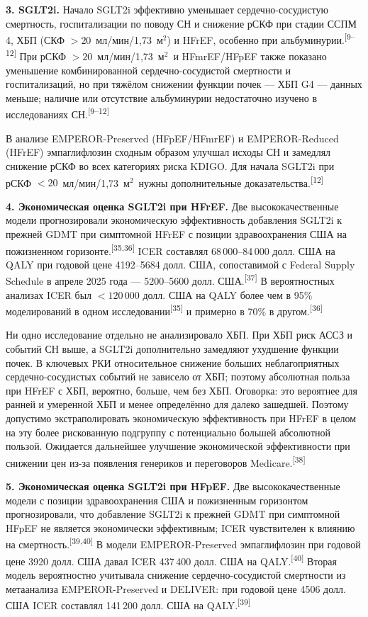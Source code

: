 \documentclass[11pt,a4paper]{article}
\newcommand{\src}[1]{\textsuperscript{[#1]}}
\newcommand{\unitgfr}{мл/мин/1,73~м$^2$}
\begin{document}
\textbf{3. SGLT2i.} Начало SGLT2i эффективно уменьшает сердечно-сосудистую смертность, госпитализации по поводу СН и снижение рСКФ при стадии ССПМ 4, ХБП (СКФ $>20$~\unitgfr) и HFrEF, особенно при альбуминурии.\src{9--12} При рСКФ $>20$~\unitgfr\ и HFmrEF/HFpEF также показано уменьшение комбинированной сердечно-сосудистой смертности и госпитализаций, но при тяжёлом снижении функции почек --- ХБП G4 --- данных меньше; наличие или отсутствие альбуминурии недостаточно изучено в исследованиях СН.\src{9--12}

В анализе EMPEROR-Preserved (HFpEF/HFmrEF) и EMPEROR-Reduced (HFrEF) эмпаглифлозин сходным образом улучшал исходы СН и замедлял снижение рСКФ во всех категориях риска KDIGO. Для начала SGLT2i при рСКФ $<20$~\unitgfr\ нужны дополнительные доказательства.\src{12}

\textbf{4. Экономическая оценка SGLT2i при HFrEF.} Две высококачественные модели прогнозировали экономическую эффективность добавления SGLT2i к прежней GDMT при симптомной HFrEF с позиции здравоохранения США на пожизненном горизонте.\src{35,36} ICER составлял 68\,000--84\,000 долл. США на QALY при годовой цене 4192--5684 долл. США, сопоставимой с Federal Supply Schedule в апреле 2025 года --- 5200--5600 долл. США.\src{37} В вероятностных анализах ICER был $<120\,000$ долл. США на QALY более чем в 95\% моделирований в одном исследовании\src{35} и примерно в 70\% в другом.\src{36}

Ни одно исследование отдельно не анализировало ХБП. При ХБП риск АССЗ и событий СН выше, а SGLT2i дополнительно замедляют ухудшение функции почек. В ключевых РКИ относительное снижение больших неблагоприятных сердечно-сосудистых событий не зависело от ХБП; поэтому абсолютная польза при HFrEF с ХБП, вероятно, больше, чем без ХБП. Оговорка: это вероятнее для ранней и умеренной ХБП и менее определённо для далеко зашедшей. Поэтому допустимо экстраполировать экономическую эффективность при HFrEF в целом на эту более рискованную подгруппу с потенциально большей абсолютной пользой. Ожидается дальнейшее улучшение экономической эффективности при снижении цен из-за появления генериков и переговоров Medicare.\src{38}

\textbf{5. Экономическая оценка SGLT2i при HFpEF.} Две высококачественные модели с позиции здравоохранения США и пожизненным горизонтом прогнозировали, что добавление SGLT2i к прежней GDMT при симптомной HFpEF не является экономически эффективным; ICER чувствителен к влиянию на смертность.\src{39,40} В модели EMPEROR-Preserved эмпаглифлозин при годовой цене 3920 долл. США давал ICER 437\,400 долл. США на QALY.\src{40} Вторая модель вероятностно учитывала снижение сердечно-сосудистой смертности из метаанализа EMPEROR-Preserved и DELIVER: при годовой цене 4506 долл. США ICER составлял 141\,200 долл. США на QALY.\src{39}
\end{document}
